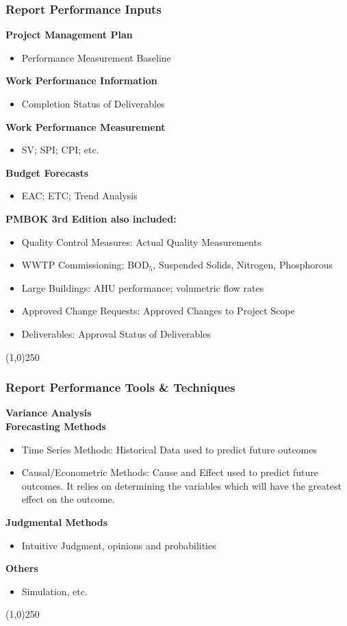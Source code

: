 \begin{frame}
\frametitle{Report Performance \hfill\hfill Inputs}
\textbf{Project Management Plan}
		\begin{itemize}
			\item Performance Measurement Baseline
		\end{itemize}
\textbf{Work Performance Information}
		\begin{itemize}
			\item Completion Status of Deliverables
		\end{itemize}
\textbf{Work Performance Measurement}
		\begin{itemize}
			\item SV; SPI; CPI; etc.
		\end{itemize}
\textbf{Budget Forecasts}
		\begin{itemize}
			\item EAC; ETC; Trend Analysis  
		\end{itemize}
\textbf{PMBOK 3rd Edition  also included:}
	\begin{itemize}
		\item Quality Control Measures: Actual Quality Measurements
		\item WWTP Commissioning; BOD$_{5}$, Suspended Solids,  Nitrogen, Phosphorous
		\item Large Buildings: AHU performance; volumetric flow rates
		\item Approved Change Requests: Approved Changes to Project Scope
		\item Deliverables: Approval Status of Deliverables
	\end{itemize}
\end{frame}\begin{center}\line(1,0){250}\end{center}



\begin{frame}
\frametitle{Report Performance \hfill\hfill Tools \& Techniques}
\textbf{Variance Analysis}\\
\textbf{Forecasting Methods}
\begin{itemize}
	\item Time Series Methods: Historical Data used to predict future outcomes
	\item Causal/Econometric Methods: Cause and Effect used to predict future outcomes. It relies on determining the variables which will have the greatest effect on the outcome. 
\end{itemize}
\textbf{Judgmental Methods}
\begin{itemize}
	\item Intuitive Judgment, opinions and probabilities 
\end{itemize}
\textbf{Others}
\begin{itemize}
	\item Simulation, etc.
\end{itemize}
\end{frame}\begin{center}\line(1,0){250}\end{center}



